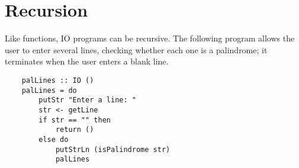 \section{Recursion}
Like functions, IO programs can be recursive. The following program allows the user to enter several lines, checking whether each one is a palindrome; it terminates when the user enters a blank line.
\begin{verbatim}
    palLines :: IO ()
    palLines = do
        putStr "Enter a line: "
        str <- getLine
        if str == "" then
            return ()
        else do
            putStrLn (isPalindrome str)
            palLines
\end{verbatim}
